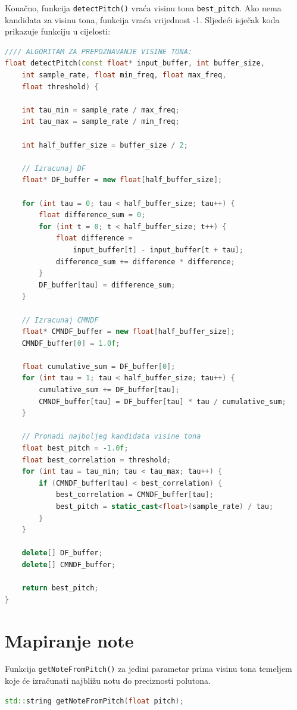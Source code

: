 \documentclass[times, utf8, diplomski, numeric]{fer}
\begin{document}
Konačno, funkcija \lstinline[basicstyle=\ttfamily]|detectPitch()| vraća visinu tona \lstinline[basicstyle=\ttfamily]|best_pitch|. Ako nema kandidata za visinu tona, funkcija vraća vrijednost -1. Sljedeći isječak koda prikazuje funkciju u cijelosti:

\begin{lstlisting}[language=C++, frame=single]
//// ALGORITAM ZA PREPOZNAVANJE VISINE TONA:
float detectPitch(const float* input_buffer, int buffer_size,
	int sample_rate, float min_freq, float max_freq,
	float threshold) {
	
	int tau_min = sample_rate / max_freq;
	int tau_max = sample_rate / min_freq;
	
	int half_buffer_size = buffer_size / 2;
	
	// Izracunaj DF
	float* DF_buffer = new float[half_buffer_size];
	
	for (int tau = 0; tau < half_buffer_size; tau++) {
		float difference_sum = 0;
		for (int t = 0; t < half_buffer_size; t++) {
			float difference = 
				input_buffer[t] - input_buffer[t + tau];
			difference_sum += difference * difference;
		}
		DF_buffer[tau] = difference_sum;
	}
	
	// Izracunaj CMNDF
	float* CMNDF_buffer = new float[half_buffer_size];
	CMNDF_buffer[0] = 1.0f;
	
	float cumulative_sum = DF_buffer[0];
	for (int tau = 1; tau < half_buffer_size; tau++) {
		cumulative_sum += DF_buffer[tau];
		CMNDF_buffer[tau] = DF_buffer[tau] * tau / cumulative_sum;
	}
	
	// Pronadi najboljeg kandidata visine tona
	float best_pitch = -1.0f;
	float best_correlation = threshold;
	for (int tau = tau_min; tau < tau_max; tau++) {
		if (CMNDF_buffer[tau] < best_correlation) {
			best_correlation = CMNDF_buffer[tau];
			best_pitch = static_cast<float>(sample_rate) / tau;
		}
	}
	
	delete[] DF_buffer;
	delete[] CMNDF_buffer;
	
	return best_pitch;
}
\end{lstlisting}

\section{Mapiranje note}
%
Funkcija \lstinline[basicstyle=\ttfamily]|getNoteFromPitch()| za jedini parametar prima visinu tona temeljem koje će izračunati najbližu notu do preciznosti polutona.

\begin{lstlisting}[language=C++, frame=single]
std::string getNoteFromPitch(float pitch);
\end{lstlisting}
\end{document}
